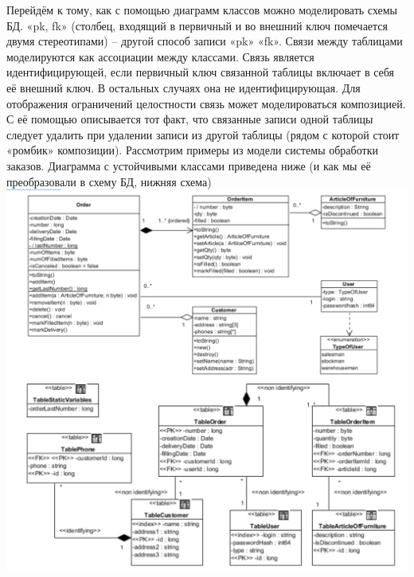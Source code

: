 Перейдём к тому, как с помощью диаграмм классов можно моделировать схемы БД. «pk, fk» (столбец, входящий в первичный и во внешний ключ помечается двумя стереотипами) – другой способ записи «pk» «fk». Связи между таблицами моделируются как ассоциации между классами. Связь является идентифицирующей, если первичный ключ связанной таблицы включает в себя её внешний ключ. В остальных случаях она не идентифицирующая. Для отображения ограничений целостности связь может моделироваться композицией. С её помощью описывается тот факт, что связанные записи одной таблицы следует удалить при удалении записи из другой таблицы (рядом с которой стоит «ромбик» композиции). Рассмотрим примеры из модели системы обработки заказов. Диаграмма с устойчивыми классами приведена ниже (и как мы её преобразовали в схему БД, нижняя схема)
\includegraphics[scale=0.06]{pics/4_4.png}

